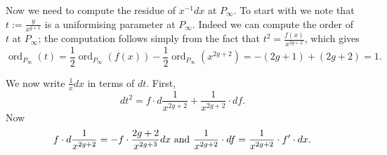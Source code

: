 \documentclass[draft, 11pt]{article} %
\theoremstyle{plain}
\theoremstyle{remark}
\DeclareMathOperator{\ord}{ord}
\begin{document}
Now we need to compute the residue of $x^{-1}dx$ at $P_\infty$.
To start with we note that $t:= \frac{y}{x^{g+1}}$ is a uniformising parameter at $P_\infty$.
Indeed we can compute the order of $t$ at $P_\infty$; the computation follows simply from the fact that $t^2 = \frac{f(x)}{x^{2g+2}}$, which gives
\[
\ord_{P_\infty}(t) = \frac{1}{2}\ord_{P_\infty}(f(x)) - \frac{1}{2}\ord_{P_\infty}(x^{2g+2}) = -(2g+1) + (2g+2) = 1.
\]

We now write $\frac{1}{x}dx$ in terms of $dt$.
First, 
\[
dt^2 = f\cdot d\frac{1}{x^{2g+2}} + \frac{1}{x^{2g+2}} \cdot df.
\]
Now 
\[
f\cdot d\frac{1}{x^{2g+2}} = -f\cdot \frac{2g+2}{x^{2g+3}} dx \ {\rm and}\ \frac{1}{x^{2g+2}} \cdot df = \frac{1}{x^{2g+2}}\cdot f' \cdot dx.
\]
\begin{comment}
So in total 
\[
dt^2 = \left (\frac{(2g+1)\cdot f}{x^{2g+3}} - \frac{f'}{x^{2g+2}} \right ) dx.
\]

Finally, we have $\frac{1}{x}dx = \frac {2\cdot x^{2g+1}}{\left ( (2g+1)\cdot \frac{f}{x} - f' \right )} \cdot t dt$.

Let $h(x) = (2g+1)\cdot \frac{f}{x} - f'$.
Note that $\deg(h(x)) = 2g-1$ since we assumed that $a_{2g}\neq 0$.
Hence $\ord_{P_\infty}\left ( \frac{2\cdot x^{2g+1}}{h(x)} \right ) = -2(2g+1) + 2(2g-1) = -4$.
We want to compute the coefficent of $t^{-2}$ in the laurent series of this.
This is because the residue of $\frac{1}{x}dx$ is the coefficient of $t^{-1}$ in $\frac{2x^{2g+1}}{h(x)}\cdot t$, which is the coefficient of $t^{-2}$ in $\frac{2x^{2g+1}}{h(x)}$.


Note that 
\begin{eqnarray}\label{h(x)}
h(x) & = & \left( \frac{a_{2g}(2g+1)x^{2g-1}}{x^{2g+1}} - \frac{2g\cdot a_{2g}\cdot x^{2g-1}}{x^{2g+1}} \right) \nonumber \\
& ~ & + \left(\frac{a_{2g-1}\cdot(2g+1)\cdot x^{2g-2}}{x^{2g+1}} - \frac{(2g-1)\cdot a_{2g-1} \cdot x^{2g-2}}{x^{2g+1}} \right) + \ldots \nonumber \\
& = & \frac{a_{2g}}{x^2} + \frac{2\cdot a_{2g-1}}{x^3} + \ldots
\end{eqnarray}

Also note that 
\begin{eqnarray}\label{t^4}
t^4 & = & \frac{f(x)^2}{x^{4g+4}} \nonumber \\
& = & \frac{a_{2g+1}^2 x^{4g+2}}{x^{4g+4}} + \frac{2\cdot a_{2g}\cdot a_{2g+1} \cdot x^{4g+1}}{x^{4g+4}} + \ldots \nonumber \\
& = & \frac{a_{2g+1}^2}{x^2} + \frac{2\cdot a_{2g} \cdot a_{2g+1}}{x^3} + \ldots
\end{eqnarray}


\end{comment}
\end{document}
